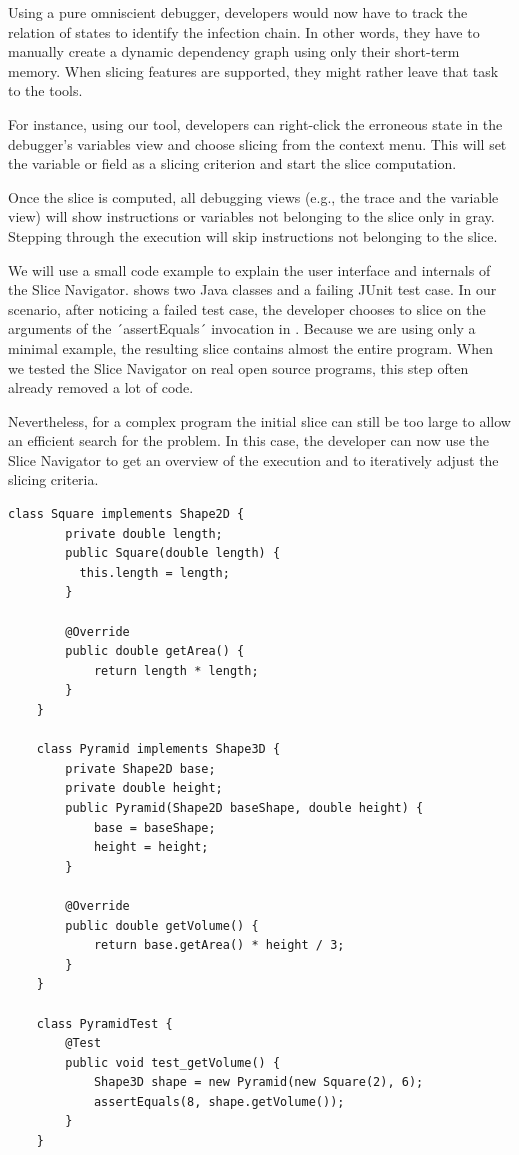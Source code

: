 Using a pure omniscient debugger, developers would now have to track the relation of states to identify the infection chain. 
In other words, they have to manually create a dynamic dependency graph using only their short-term memory. 
When slicing features are supported, they might rather leave that task to the tools.

For instance, using our tool, developers can right-click the erroneous state in the debugger's variables view and choose slicing from the context menu.
This will set the variable or field as a slicing criterion and start the slice computation.

Once the slice is computed, all debugging views (e.g., the trace and the variable view) will show instructions or variables not belonging to the slice only in gray.
Stepping through the execution will skip instructions not belonging to the slice.

We will use a small code example to explain the user interface and internals of the Slice Navigator. 
 shows two Java classes and a failing JUnit test case.
In our scenario, after noticing a failed test case, the developer chooses to slice on the arguments of the ´assertEquals´ invocation in .
Because we are using only a minimal example, the resulting slice contains almost the entire program.
When we tested the Slice Navigator on real open source programs, this step often already removed a lot of code.

Nevertheless, for a complex program the initial slice can still be too large to allow an efficient search for the problem.
In this case, the developer can now use the Slice Navigator to get an overview of the execution and to iteratively adjust the slicing criteria.

\begin{lstlisting}[float=t,label=lst:example,caption={Example program with a failing test case}]
	class Square implements Shape2D {
		private double length;
		public Square(double length) { 
		  this.length = length;
		}
		
		@Override
		public double getArea() { 
			return length * length;
		}
	}
	
	class Pyramid implements Shape3D {
		private Shape2D base;
		private double height;
		public Pyramid(Shape2D baseShape, double height) {
			base = baseShape;
			height = height;
		}
		
		@Override
		public double getVolume() { 
			return base.getArea() * height / 3; 
		}
	}
	
	class PyramidTest {
		@Test
		public void test_getVolume() {
			Shape3D shape = new Pyramid(new Square(2), 6);
			assertEquals(8, shape.getVolume());
		}
	}
\end{lstlisting}


